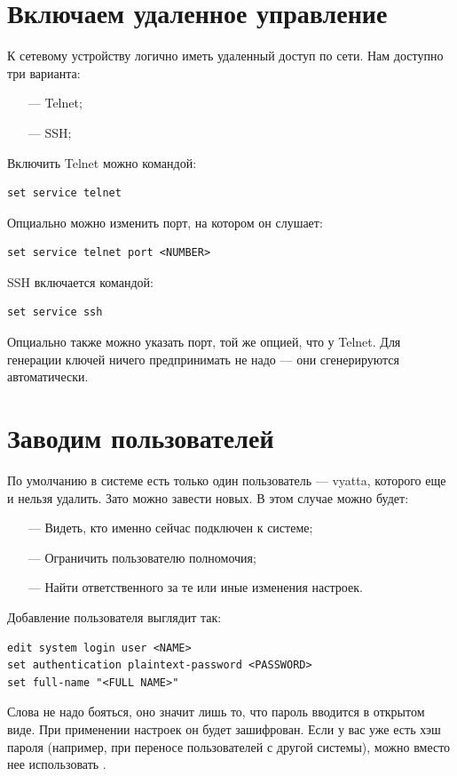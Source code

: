 \documentclass[a4paper,12pt, twoside, russian]{report}
\begin{document}
\section{Включаем удаленное управление}
К сетевому устройству логично иметь удаленный доступ по сети. Нам доступно три варианта:
\begin{itemize}
 \item[---] Telnet;
 \item[---] SSH;
\end{itemize}

Включить Telnet можно командой: \begin{verbatim}set service telnet\end{verbatim} Опциально можно изменить порт,
на котором он слушает: \begin{verbatim}set service telnet port <NUMBER>\end{verbatim}

SSH включается командой: \begin{verbatim}set service ssh\end{verbatim} Опциально также можно указать порт,
той же опцией, что у Telnet. Для генерации ключей ничего предпринимать не надо --- они сгенерируются автоматически.

\section{Заводим пользователей}
По умолчанию в системе есть только один пользователь --- vyatta, которого еще и нельзя удалить. Зато можно
завести новых. В этом случае можно будет:
\begin{itemize}
 \item[---] Видеть, кто именно сейчас подключен к системе;
 \item[---] Ограничить пользователю полномочия;
 \item[---] Найти ответственного за те или иные изменения настроек.
\end{itemize}

Добавление пользователя выглядит так:
\begin{verbatim}
edit system login user <NAME>
set authentication plaintext-password <PASSWORD>
set full-name "<FULL NAME>"
\end{verbatim}

Слова  не надо бояться, оно значит лишь то, что пароль вводится в открытом виде.
При применении настроек он будет зашифрован. Если у вас уже есть хэш пароля (например, при переносе
пользователей с другой системы), можно вместо нее использовать .
\end{document}
